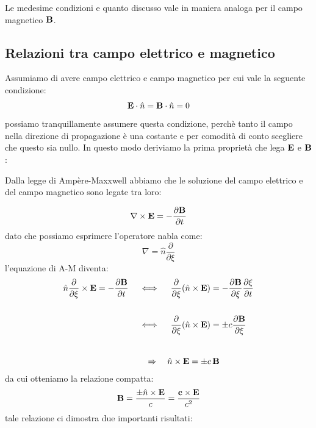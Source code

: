 Le medesime condizioni e quanto discusso vale in maniera analoga per il campo magnetico $\bold{B}$.

\subsection{Relazioni tra campo elettrico e magnetico}

Assumiamo di avere campo elettrico e campo magnetico per cui vale la seguente condizione:
\begin{equation*}
	\bold{E} \cdot \hat{n} = \bold{B} \cdot \hat{n} = 0
\end{equation*}
possiamo tranquillamente assumere questa condizione, perch\`e tanto il campo nella direzione di propagazione \`e una costante e per comodit\`a di conto scegliere che questo sia nullo. In questo modo deriviamo la prima propriet\`a che lega $\bold{E}$ e $\bold{B}$:

\begin{center}
\end{center}
Dalla legge di Amp\`ere-Maxxwell abbiamo che le soluzione del  campo elettrico e del campo magnetico sono legate tra loro:

\begin{equation*}
	\nabla \times \bold{E} = - \frac{\partial \bold{B}}{\partial t}
\end{equation*}
dato che possiamo esprimere l'operatore nabla come:
\begin{equation*}
	\nabla = \hat{n} \frac{\partial }{\partial \xi}
\end{equation*}
l'equazione di A-M diventa:
\begin{align*}
	\hat{n} \frac{\partial}{\partial \xi} \times \bold{E} = - \frac{\partial \bold{B}}{\partial t} \quad & \iff \quad \frac{\partial}{\partial \xi}(\hat{n} \times \bold{E}) = - \frac{\partial \bold{B}}{\partial \xi} \frac{\partial \xi}{\partial t} \\ \rule{0pt}{30pt}
	& \iff \quad \frac{\partial}{\partial \xi}(\hat{n} \times \bold{E}) = \pm c \frac{\partial \bold{B}}{\partial \xi} \\ \rule{0pt}{30pt}
	& \quad \Rightarrow \quad \hat{n} \times \bold{E} = \pm c\,\bold{B}
\end{align*}
da cui otteniamo la relazione compatta:
\begin{equation}
	\bold{B} = \frac{\pm \hat{n} \times \bold{E}}{c} = \frac{\bold{c} \times \bold{E}}{c^2}
\end{equation}
tale relazione ci dimostra due importanti risultati:

